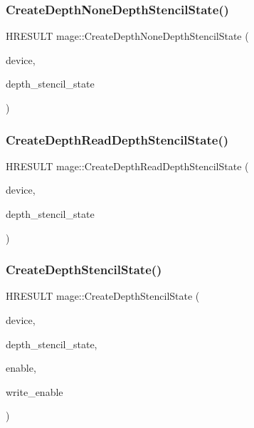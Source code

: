 \hypertarget{namespacemage_ab1edddad5787ae095bc03f1cf5c54564}{}\label{namespacemage_ab1edddad5787ae095bc03f1cf5c54564} 
\subsubsection{\texorpdfstring{Create\+Depth\+None\+Depth\+Stencil\+State()}{CreateDepthNoneDepthStencilState()}}
{\footnotesize\ttfamily H\+R\+E\+S\+U\+LT mage\+::\+Create\+Depth\+None\+Depth\+Stencil\+State (\begin{DoxyParamCaption}\item[{I\+D3\+D11\+Device2 $\ast$}]{device,  }\item[{I\+D3\+D11\+Depth\+Stencil\+State $\ast$$\ast$}]{depth\+\_\+stencil\+\_\+state }\end{DoxyParamCaption})}

\hypertarget{namespacemage_a56b331ac7866106016040e4ebce50790}{}\label{namespacemage_a56b331ac7866106016040e4ebce50790} 
\subsubsection{\texorpdfstring{Create\+Depth\+Read\+Depth\+Stencil\+State()}{CreateDepthReadDepthStencilState()}}
{\footnotesize\ttfamily H\+R\+E\+S\+U\+LT mage\+::\+Create\+Depth\+Read\+Depth\+Stencil\+State (\begin{DoxyParamCaption}\item[{I\+D3\+D11\+Device2 $\ast$}]{device,  }\item[{I\+D3\+D11\+Depth\+Stencil\+State $\ast$$\ast$}]{depth\+\_\+stencil\+\_\+state }\end{DoxyParamCaption})}

\hypertarget{namespacemage_a8821b7d9587082504cb1f4d04e53ff05}{}\label{namespacemage_a8821b7d9587082504cb1f4d04e53ff05} 
\subsubsection{\texorpdfstring{Create\+Depth\+Stencil\+State()}{CreateDepthStencilState()}}
{\footnotesize\ttfamily H\+R\+E\+S\+U\+LT mage\+::\+Create\+Depth\+Stencil\+State (\begin{DoxyParamCaption}\item[{I\+D3\+D11\+Device2 $\ast$}]{device,  }\item[{I\+D3\+D11\+Depth\+Stencil\+State $\ast$$\ast$}]{depth\+\_\+stencil\+\_\+state,  }\item[{bool}]{enable,  }\item[{bool}]{write\+\_\+enable }\end{DoxyParamCaption})}

